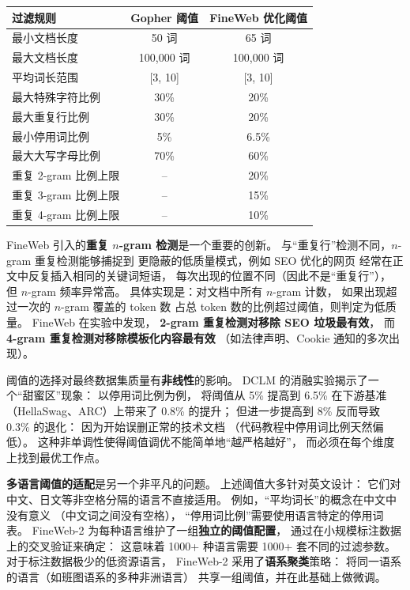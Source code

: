 \begin{center}\small
\renewcommand{\arraystretch}{1.3}
\begin{tabular}{lcc}
\toprule
\rowcolor{figLightGray}
\textbf{过滤规则} & \textbf{Gopher 阈值} & \textbf{FineWeb 优化阈值} \\
\midrule
最小文档长度 & 50 词 & 65 词 \\
最大文档长度 & 100,000 词 & 100,000 词 \\
平均词长范围 & [3, 10] & [3, 10] \\
最大特殊字符比例 & 30\% & 20\% \\
最大重复行比例 & 30\% & 20\% \\
最小停用词比例 & 5\% & 6.5\% \\
最大大写字母比例 & 70\% & 60\% \\
重复 2-gram 比例上限 & -- & 20\% \\
重复 3-gram 比例上限 & -- & 15\% \\
重复 4-gram 比例上限 & -- & 10\% \\
\bottomrule
\end{tabular}
\end{center}

FineWeb 引入的\textbf{重复 $n$-gram 检测}是一个重要的创新。
与“重复行”检测不同，$n$-gram 重复检测能够捕捉到
更隐蔽的低质量模式，例如 SEO 优化的网页
经常在正文中反复插入相同的关键词短语，
每次出现的位置不同（因此不是“重复行”），
但 $n$-gram 频率异常高。
具体实现是：对文档中所有 $n$-gram 计数，
如果出现超过一次的 $n$-gram 覆盖的 token 数
占总 token 数的比例超过阈值，则判定为低质量。
FineWeb 在实验中发现，
\textbf{2-gram 重复检测对移除 SEO 垃圾最有效}，
而 \textbf{4-gram 重复检测对移除模板化内容最有效}
（如法律声明、Cookie 通知的多次出现）。

阈值的选择对最终数据集质量有\textbf{非线性}的影响。
DCLM 的消融实验揭示了一个“甜蜜区”现象：
以停用词比例为例，
将阈值从 5\% 提高到 6.5\%
在下游基准（HellaSwag、ARC）上带来了 0.8\% 的提升；
但进一步提高到 8\%
反而导致 0.3\% 的退化：
因为开始误删正常的技术文档
（代码教程中停用词比例天然偏低）。
这种非单调性使得阈值调优不能简单地“越严格越好”，
而必须在每个维度上找到最优工作点。

\textbf{多语言阈值的适配}是另一个非平凡的问题。
上述阈值大多针对英文设计：
它们对中文、日文等非空格分隔的语言不直接适用。
例如，“平均词长”的概念在中文中没有意义
（中文词之间没有空格），
“停用词比例”需要使用语言特定的停用词表。
FineWeb-2 为每种语言维护了一组\textbf{独立的阈值配置}，
通过在小规模标注数据上的交叉验证来确定：
这意味着 1000+ 种语言需要 1000+ 套不同的过滤参数。
对于标注数据极少的低资源语言，
FineWeb-2 采用了\textbf{语系聚类}策略：
将同一语系的语言（如班图语系的多种非洲语言）
共享一组阈值，并在此基础上做微调。

